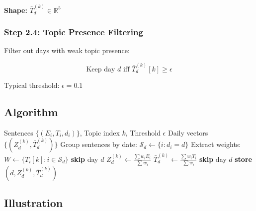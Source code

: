 \documentclass[12pt]{article}
\begin{document}
\textbf{Shape:} $\bar{T}_d^{(k)} \in \mathbb{R}^{5}$

\subsubsection{Step 2.4: Topic Presence Filtering}

Filter out days with weak topic presence:

\begin{equation}
\text{Keep day } d \text{ iff } \bar{T}_d^{(k)}[k] \geq \epsilon
\end{equation}

Typical threshold: $\epsilon = 0.1$

\subsection{Algorithm}

\begin{algorithm}[H]
\caption{Daily Weighted Aggregation}
\begin{algorithmic}[1]
\REQUIRE Sentences $\{(E_i, T_i, d_i)\}$, Topic index $k$, Threshold $\epsilon$
\ENSURE Daily vectors $\{(Z_d^{(k)}, \bar{T}_d^{(k)})\}$
\STATE Group sentences by date: $\mathcal{S}_d \leftarrow \{i : d_i = d\}$
    \STATE Extract weights: $W \leftarrow \{T_i[k] : i \in \mathcal{S}_d\}$
        \STATE \textbf{skip} day $d$
    \ENDIF
    \STATE $Z_d^{(k)} \leftarrow \frac{\sum w_i E_i}{\sum w_i}$
    \STATE $\bar{T}_d^{(k)} \leftarrow \frac{\sum w_i T_i}{\sum w_i}$
        \STATE \textbf{skip} day $d$
    \ENDIF
    \STATE \textbf{store} $(d, Z_d^{(k)}, \bar{T}_d^{(k)})$
\ENDFOR
\end{algorithmic}
\end{algorithm}

\subsection{Illustration}
\end{document}
